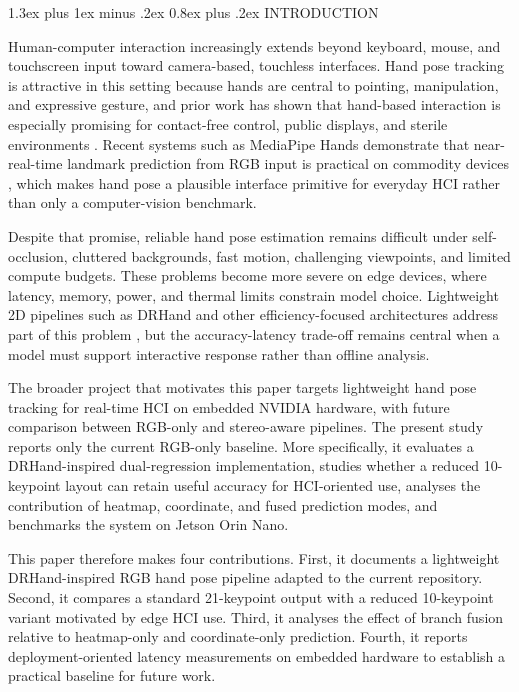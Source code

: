 \documentclass[10pt,letterpaper,twocolumn]{article}
\makeatletter
\renewcommand\section{\@startsection{section}{1}{\z@}%
  {1.3ex plus 1ex minus .2ex}%
  {0.8ex plus .2ex}%
  {\centering\normalfont\small\scshape}}
\makeatother
\begin{document}
\section{INTRODUCTION}

Human-computer interaction increasingly extends beyond keyboard, mouse, and touchscreen input toward camera-based, touchless interfaces. Hand pose tracking is attractive in this setting because hands are central to pointing, manipulation, and expressive gesture, and prior work has shown that hand-based interaction is especially promising for contact-free control, public displays, and sterile environments \cite{vuletic,wachs,li_vr}. Recent systems such as MediaPipe Hands demonstrate that near-real-time landmark prediction from RGB input is practical on commodity devices \cite{mediapipe}, which makes hand pose a plausible interface primitive for everyday HCI rather than only a computer-vision benchmark.

Despite that promise, reliable hand pose estimation remains difficult under self-occlusion, cluttered backgrounds, fast motion, challenging viewpoints, and limited compute budgets. These problems become more severe on edge devices, where latency, memory, power, and thermal limits constrain model choice. Lightweight 2D pipelines such as DRHand and other efficiency-focused architectures address part of this problem \cite{dualreg,srhandnet,fasthand,attentionlite}, but the accuracy-latency trade-off remains central when a model must support interactive response rather than offline analysis.

The broader project that motivates this paper targets lightweight hand pose tracking for real-time HCI on embedded NVIDIA hardware, with future comparison between RGB-only and stereo-aware pipelines. The present study reports only the current RGB-only baseline. More specifically, it evaluates a DRHand-inspired dual-regression implementation, studies whether a reduced 10-keypoint layout can retain useful accuracy for HCI-oriented use, analyses the contribution of heatmap, coordinate, and fused prediction modes, and benchmarks the system on Jetson Orin Nano.

This paper therefore makes four contributions. First, it documents a lightweight DRHand-inspired RGB hand pose pipeline adapted to the current repository. Second, it compares a standard 21-keypoint output with a reduced 10-keypoint variant motivated by edge HCI use. Third, it analyses the effect of branch fusion relative to heatmap-only and coordinate-only prediction. Fourth, it reports deployment-oriented latency measurements on embedded hardware to establish a practical baseline for future work.
\end{document}
